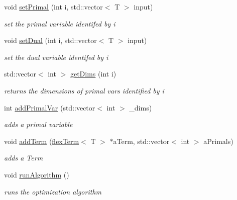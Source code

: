\begin{DoxyCompactItemize}
void \hyperlink{classflex_box_aacb08dc862943d6bb24353a62e2c9341}{set\+Primal} (int i, std\+::vector$<$ T $>$ input)
\begin{DoxyCompactList}\small\item\em set the primal variable identifed by i \end{DoxyCompactList}\item 
void \hyperlink{classflex_box_a77e4f589d87b7c34170778c9abbea3b3}{set\+Dual} (int i, std\+::vector$<$ T $>$ input)
\begin{DoxyCompactList}\small\item\em set the dual variable identifed by i \end{DoxyCompactList}\item 
std\+::vector$<$ int $>$ \hyperlink{classflex_box_a4007f118251e0d9787b373709b498785}{get\+Dims} (int i)
\begin{DoxyCompactList}\small\item\em returns the dimensions of primal vars identified by i \end{DoxyCompactList}\item 
int \hyperlink{classflex_box_a659aac107b85ecf64c9fd1aaa465a98d}{add\+Primal\+Var} (std\+::vector$<$ int $>$ \+\_\+dims)
\begin{DoxyCompactList}\small\item\em adds a primal variable \end{DoxyCompactList}\item 
void \hyperlink{classflex_box_a4cba554c506d130824ace967bae82ac3}{add\+Term} (\hyperlink{classflex_term}{flex\+Term}$<$ T $>$ $\ast$a\+Term, std\+::vector$<$ int $>$ a\+Primals)
\begin{DoxyCompactList}\small\item\em adds a Term \end{DoxyCompactList}\item 
\mbox{\label{classflex_box_a796367904304f13a82c9fe729c4924d9}} 
void \hyperlink{classflex_box_a796367904304f13a82c9fe729c4924d9}{run\+Algorithm} ()
\begin{DoxyCompactList}\small\item\em runs the optimization algorithm \end{DoxyCompactList}\end{DoxyCompactItemize}
